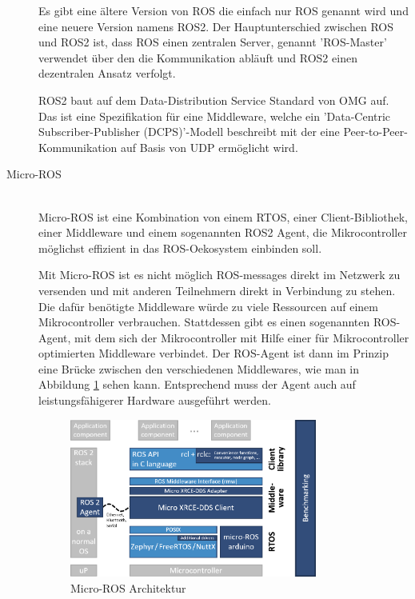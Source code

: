 \begin{flushleft}
\begin{description}
        Es gibt eine ältere Version von ROS die einfach nur ROS genannt wird und eine neuere Version namens ROS2.
        Der Hauptunterschied zwischen ROS und ROS2 ist, dass ROS einen zentralen Server, genannt 'ROS-Master' verwendet über den die Kommunikation abläuft und ROS2 einen dezentralen Ansatz verfolgt.
        
        ROS2 baut auf dem Data-Distribution Service Standard von OMG auf. 
        Das ist eine Spezifikation für eine Middleware, welche ein 'Data-Centric Subscriber-Publisher (DCPS)'-Modell beschreibt mit der eine Peer-to-Peer-Kommunikation auf Basis von UDP ermöglicht wird.

        \item[Micro-ROS]\hfill\\
        Micro-ROS ist eine Kombination von einem RTOS, einer Client-Bibliothek, einer Middleware und einem sogenannten ROS2 Agent, 
        die Mikrocontroller möglichst effizient in das ROS-Oekosystem einbinden soll.
        
        Mit Micro-ROS ist es nicht möglich ROS-messages direkt im Netzwerk zu versenden und mit anderen Teilnehmern direkt in Verbindung zu stehen.
        Die dafür benötigte Middleware würde zu viele Ressourcen auf einem Mikrocontroller verbrauchen. 
        Stattdessen gibt es einen sogenannten ROS-Agent, mit dem sich der Mikrocontroller mit Hilfe einer für Mikrocontroller optimierten Middleware verbindet.
        Der ROS-Agent ist dann im Prinzip eine Brücke zwischen den verschiedenen Middlewares, wie man in Abbildung \ref{fig:micro-ros-architecture} sehen kann. Entsprechend muss der Agent auch auf leistungsfähigerer Hardware ausgeführt werden.    
        \cite{micro_ros_concepts}
        \begin{figure}[h!]
            \centering
            \includegraphics[width=0.8\textwidth]{imgs/Grundbegriffe/micro-ROS_architecture.png}
            \caption{Micro-ROS Architektur}
            \label{fig:micro-ros-architecture}%
        \end{figure}
    \end{description}
\end{flushleft}

